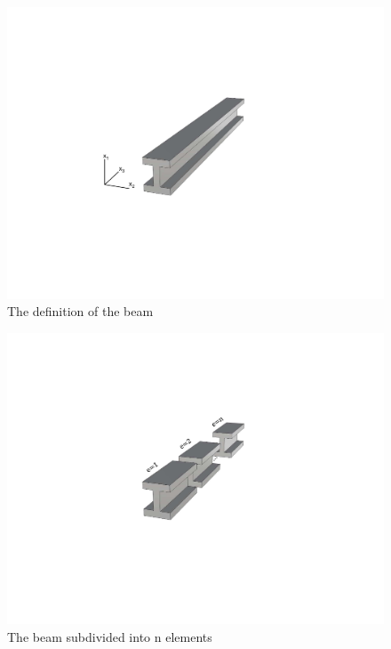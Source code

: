 \begin{figure}[htb]
\centering
\includegraphics[width=0.95\columnwidth,trim=4cm 7cm 6cm 6.5cm, clip]{figs/straight.pdf}
\caption{The definition of the beam}
 \label{fig:beam_definition}
\end{figure}


\begin{figure}
\centering
\includegraphics[width=0.7\columnwidth,trim=0cm 12cm 0cm 0cm, clip]{figs/elements.pdf}
\caption{The beam subdivided into n elements}
\label{fig:subdivision}
\end{figure}

